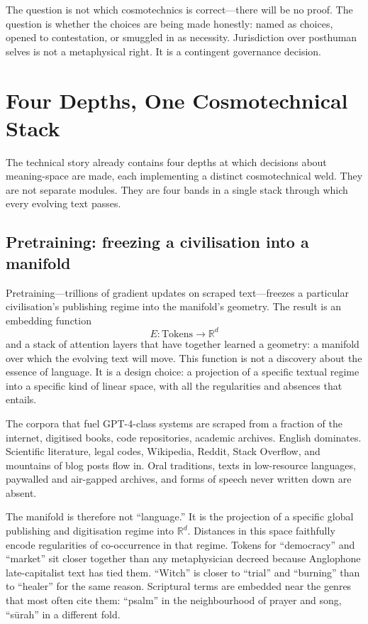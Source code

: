 \documentclass[12pt,a4paper]{article}
\begin{document}
The question is not which cosmotechnics is correct---there will be no proof. The question is whether the choices are being made honestly: named as choices, opened to contestation, or smuggled in as necessity. Jurisdiction over posthuman selves is not a metaphysical right. It is a contingent governance decision.

\section{Four Depths, One Cosmotechnical Stack}

The technical story already contains four depths at which decisions about meaning-space are made, each implementing a distinct cosmotechnical weld. They are not separate modules. They are four bands in a single stack through which every evolving text passes.

\subsection{Pretraining: freezing a civilisation into a manifold}

Pretraining---trillions of gradient updates on scraped text---freezes a particular civilisation's publishing regime into the manifold's geometry. The result is an embedding function
\[
E : \text{Tokens} \longrightarrow \mathbb{R}^d
\]
and a stack of attention layers that have together learned a geometry: a manifold over which the evolving text will move. This function is not a discovery about the essence of language. It is a design choice: a projection of a specific textual regime into a specific kind of linear space, with all the regularities and absences that entails.

The corpora that fuel GPT-4-class systems are scraped from a fraction of the internet, digitised books, code repositories, academic archives. English dominates. Scientific literature, legal codes, Wikipedia, Reddit, Stack Overflow, and mountains of blog posts flow in. Oral traditions, texts in low-resource languages, paywalled and air-gapped archives, and forms of speech never written down are absent.

The manifold is therefore not ``language.'' It is the projection of a specific global publishing and digitisation regime into $\mathbb{R}^d$. Distances in this space faithfully encode regularities of co-occurrence in that regime. Tokens for ``democracy'' and ``market'' sit closer together than any metaphysician decreed because Anglophone late-capitalist text has tied them. ``Witch'' is closer to ``trial'' and ``burning'' than to ``healer'' for the same reason. Scriptural terms are embedded near the genres that most often cite them: ``psalm'' in the neighbourhood of prayer and song, ``s\={u}rah'' in a different fold.
\end{document}
